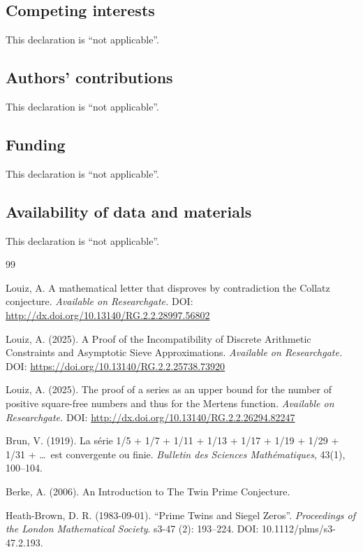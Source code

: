 \documentclass[11pt]{article}
\begin{document}
\subsection*{Competing interests}
This declaration is ``not applicable''.

\subsection*{Authors' contributions}
This declaration is ``not applicable''.

\subsection*{Funding}
This declaration is ``not applicable''.

\subsection*{Availability of data and materials}
This declaration is ``not applicable''.

\begin{thebibliography}{99}

 Louiz, A. A mathematical letter that disproves by contradiction the Collatz conjecture. \textit{Available on Researchgate.} DOI: \url{http://dx.doi.org/10.13140/RG.2.2.28997.56802}

 Louiz, A. (2025). A Proof of the Incompatibility of Discrete Arithmetic Constraints and Asymptotic Sieve Approximations. \textit{Available on Researchgate.} DOI: \url{https://doi.org/10.13140/RG.2.2.25738.73920}

 Louiz, A. (2025). The proof of a series as an upper bound for the number of positive square-free numbers and thus for the Mertens function. \textit{Available on Researchgate.} DOI: \url{http://dx.doi.org/10.13140/RG.2.2.26294.82247}

 Brun, V. (1919). La s\'erie 1/5 + 1/7 + 1/11 + 1/13 + 1/17 + 1/19 + 1/29 + 1/31 + \ldots\ est convergente ou finie. \textit{Bulletin des Sciences Math\'ematiques}, 43(1), 100--104.

 Berke, A. (2006). An Introduction to The Twin Prime Conjecture.

 Heath-Brown, D. R. (1983-09-01). ``Prime Twins and Siegel Zeros''. \textit{Proceedings of the London Mathematical Society}. s3-47 (2): 193--224. DOI: 10.1112/plms/s3-47.2.193.

\end{thebibliography}
\end{document}
